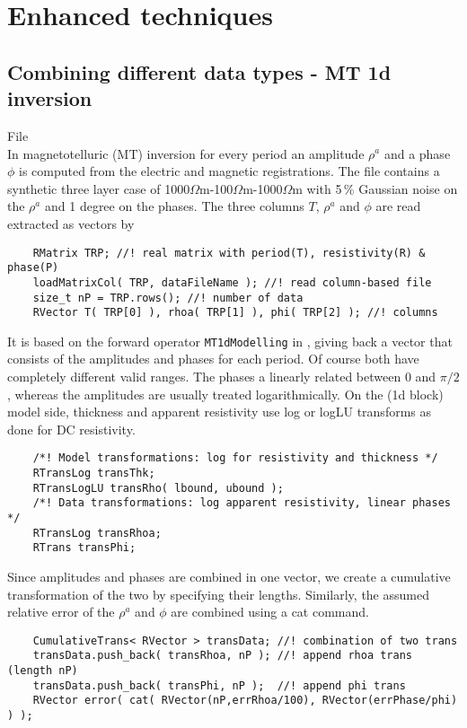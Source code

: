 \section{Enhanced techniques}\label{sec:enhanced}
\subsection{Combining different data types - MT 1d inversion}\label{sec:mt1d}
File \\
In magnetotelluric (MT) inversion for every period an amplitude $\rho^a$ and a phase $\phi$ is computed from the electric and magnetic registrations. The file  contains a synthetic three layer case of 1000$\Omega$m-100$\Omega$m-1000$\Omega$m with 5\,\% Gaussian noise on the $\rho^a$ and 1 degree on the phases.
The three columns $T$, $\rho^a$ and $\phi$ are read extracted as vectors by
\begin{lstlisting}
    RMatrix TRP; //! real matrix with period(T), resistivity(R) & phase(P)
    loadMatrixCol( TRP, dataFileName ); //! read column-based file
    size_t nP = TRP.rows(); //! number of data
    RVector T( TRP[0] ), rhoa( TRP[1] ), phi( TRP[2] ); //! columns
\end{lstlisting}
It is based on the forward operator \lstinline|MT1dModelling| in , giving back a vector that consists of the amplitudes and phases for each period. 
Of course both have completely different valid ranges. 
The phases a linearly related between 0 and $\pi/2$, whereas the amplitudes are usually treated logarithmically.
On the (1d block) model side, thickness and apparent resistivity use log or logLU transforms as done for DC resistivity.
\begin{lstlisting}
    /*! Model transformations: log for resistivity and thickness */
    RTransLog transThk;
    RTransLogLU transRho( lbound, ubound );
    /*! Data transformations: log apparent resistivity, linear phases */
    RTransLog transRhoa;
    RTrans transPhi;
\end{lstlisting}
Since amplitudes and phases are combined in one vector, we create a cumulative transformation of the two by specifying their lengths. 
Similarly, the assumed relative error of the $\rho^a$ and $\phi$ are combined using a cat command.
\begin{lstlisting}
    CumulativeTrans< RVector > transData; //! combination of two trans
    transData.push_back( transRhoa, nP ); //! append rhoa trans (length nP)
    transData.push_back( transPhi, nP );  //! append phi trans
    RVector error( cat( RVector(nP,errRhoa/100), RVector(errPhase/phi) ) );
\end{lstlisting}

